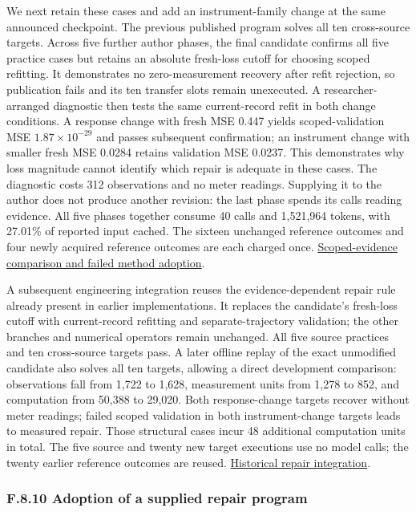 \documentclass[twoside,11pt]{article}
\begin{document}
We next retain these cases and add an instrument-family change at the same
announced checkpoint. The previous published program solves all ten cross-source
targets. Across five further author phases, the final candidate confirms all five
practice cases but retains an absolute fresh-loss cutoff for choosing scoped
refitting. It demonstrates no zero-measurement recovery after refit rejection,
so publication fails and its ten transfer slots remain unexecuted. A
researcher-arranged diagnostic then tests the same current-record refit in both
change conditions. A response change with fresh MSE 0.447 yields scoped-validation
MSE \(1.87\times10^{-29}\) and passes subsequent confirmation; an instrument change
with smaller fresh MSE 0.0284 retains validation MSE 0.0237. This demonstrates why
loss magnitude cannot identify which repair is adequate in these cases. The
diagnostic costs 312 observations and no meter readings. Supplying it to the
author does not produce another revision: the last phase spends its calls reading
evidence. All five phases together consume 40 calls and 1,521,964 tokens, with
27.01\% of reported input cached. The sixteen unchanged reference outcomes and
four newly acquired reference outcomes are each charged once.
\hyperlink{artifact-90}{Scoped-evidence comparison and failed method adoption}.


A subsequent engineering integration reuses the evidence-dependent repair rule
already present in earlier implementations. It replaces the candidate's
fresh-loss cutoff with current-record refitting and separate-trajectory validation;
the other branches and numerical operators remain unchanged. All five source
practices and ten cross-source targets pass. A later offline replay of the exact
unmodified candidate also solves all ten targets, allowing a direct development
comparison: observations fall from 1,722 to 1,628, measurement units from 1,278 to
852, and computation from 50,388 to 29,020. Both response-change targets recover
without meter readings; failed scoped validation in both instrument-change targets
leads to measured repair. Those structural cases incur 48 additional computation
units in total. The five source and twenty new target executions use no model
calls; the twenty earlier reference outcomes are reused.
\hyperlink{artifact-91}{Historical repair integration}.


\subsubsection*{F.8.10 Adoption of a supplied repair program}
\end{document}
